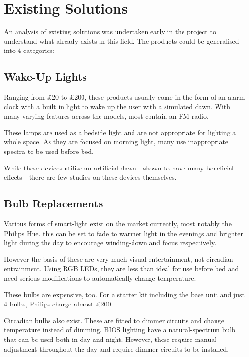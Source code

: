 \section{Existing Solutions}
\label{Lit:solutions}

An analysis of existing solutions was undertaken early in the project to understand what already exists in this field. The products could be generalised into 4 categories:

\subsection{Wake-Up Lights}

Ranging from £20 to £200, these products usually come in the form of an alarm clock with a built in light to wake up the user with a simulated dawn. With many varying features across the models, most contain an FM radio.

These lamps are used as a bedside light and are not appropriate for lighting a whole space. As they are focused on morning light, many use inappropriate spectra to be used before bed.

 While these devices utilise an artificial dawn - shown to have many beneficial effects - there are few studies on these devices themselves.

\subsection{Bulb Replacements}

Various forms of smart-light exist on the market currently, most notably the Philips Hue. this can be set to fade to warmer light in the evenings and brighter light during the day to encourage winding-down and focus respectively. 

However the basis of these are very much visual entertainment, not circadian entrainment. Using RGB LEDs, they are less than ideal for use before bed and need serious modifications to automatically change temperature.

These bulbs are expensive, too.  For a starter kit including the base unit and just 4 bulbs, Philips charge almost £200.

Circadian bulbs also exist. These are fitted to dimmer circuits and change temperature instead of dimming. BIOS lighting have a natural-spectrum bulb that can be used both in day and night. However, these require manual adjustment throughout the day and require dimmer circuits to be installed.

